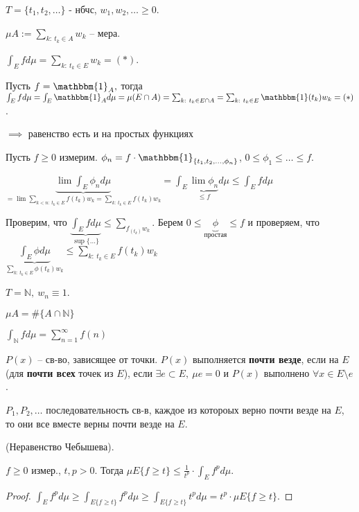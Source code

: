 \begin{example}
    $T = \{ t_1, t_2, \dots \}$ - нбчс, $w_1, w_2, \dots \geq 0$.

    $\mu A := \sum_{k: \ t_k \in A}{w_k}$ -- мера.

    $\int_E{f d \mu} = \sum_{k: \ t_k \in E}{w_k} = (*)$.

    Пусть $f = \mathbbm{1}_A, $ тогда $\int_E{f d \mu} = \int_E{\mathbbm{1}_A d \mu} = \mu (E \cap A) = \sum_{k: \ t_k \in E \cap A} = \sum_{k: \ t_k \in E}{\mathbbm{1}(t_k) w_k} = (*)$. \newline

    $\implies$ равенство есть и на простых функциях

    Пусть $f \geq 0$ измерим. $\phi_n = f \cdot \mathbbm{1}_{\{ t_1, t_2, \dots, \phi_n \}}$, $0 \leq \phi_1 \leq \dots \leq f$.

    $\underbrace{\lim{\int_E{\phi_n d \mu}}}_{= \lim \sum_{k<n: \ t_k \in E}{f(t_k) w_k} = \sum_{k: \ t_k \in E}{f(t_k) w_k}} = \int_E{\underbrace{\lim{\phi_n}}_{\leq f} d \mu} \leq \int_E {f d \mu}$

    Проверим, что $\underbrace{\int_E{f d \mu}}_{\sup \{ \dots\}} \leq \sum_{f_(t_k)w_k}$. Берем $0 \leq \underbrace{\phi}_{\text{простая}} \leq f$ и проверяем, что $\underbrace{\int_E{\phi d \mu}}_{\sum_{k: \ t_k \in E}{\phi(t_k) w_k}} \leq \sum_{k: \ t_k \in E}{f(t_k)w_k}$
\end{example}
\begin{remark}
    $T = \mathbb{N}, \ w_n \equiv 1$.

    $\mu A = \#\{ A \cap \mathbb{N} \}$

    $\int_{\mathbb{N}}{f d \mu} = \sum_{n=1}^{\infty} f(n)$
\end{remark}

\begin{definition}
    $P(x)$ -- св-во, зависящее от точки. $P(x)$ выполняется \textbf{почти везде}, если на $E$ (для \textbf{почти всех} точек из $E$), если $\exists e \subset E, \ \mu e = 0$ и $P(x)$ выполнено $\forall x \in E \setminus e$.
\end{definition}

\begin{remark}
    $P_1, P_2, \dots$ последовательность св-в, каждое из котороых верно почти везде на $E$, то они все вместе верны почти везде на $E$.
\end{remark}

\begin{theorem}
    (Неравенство Чебышева).
    
    $f \geq 0$ измер., $t, p > 0$. Тогда $\mu E \{ f \geq t \} \leq \frac{1}{t^p} \cdot \int_E{f^p d \mu}$.
\end{theorem}
\begin{proof}
    $\int_E{f^p d \mu} \geq \int_{E\{ f \geq t \}}{f^p d \mu} \geq \int_{E\{ f \geq t \}}{t^p d \mu} = t^p \cdot \mu E \{ f \geq t \}$.
\end{proof}

